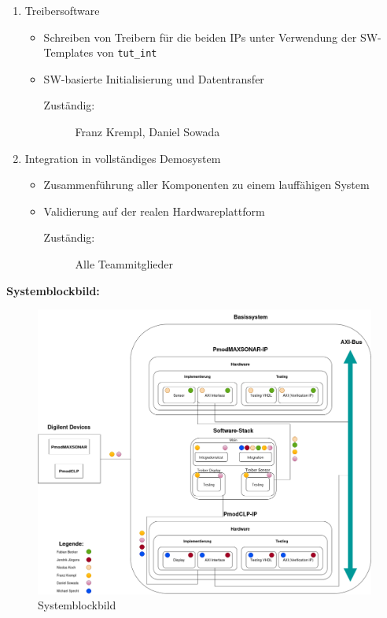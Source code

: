 \begin{enumerate}
   \item Treibersoftware
   \begin{itemize}
     \item Schreiben von Treibern für die beiden IPs unter Verwendung der SW-Templates von \texttt{tut\_int}
     \item SW-basierte Initialisierung und Datentransfer
     \begin{description}
       \item[Zuständig:] Franz Krempl, Daniel Sowada
     \end{description}
   \end{itemize}
   \item Integration in vollständiges Demosystem
   \begin{itemize}
     \item Zusammenführung aller Komponenten zu einem lauffähigen System
     \item Validierung auf der realen Hardwareplattform
     \begin{description}
       \item[Zuständig:] Alle Teammitglieder
     \end{description}
   \end{itemize}
\end{enumerate}
\textbf{Systemblockbild:}\\
\begin{figure}[h!]
  \centering
  \begin{minipage}{\textwidth}
      \includegraphics[width=\linewidth]{./images/system_updated_white.drawio.png} %
  \end{minipage}
  \caption{Systemblockbild}
  \label{fig:system}
\end{figure}
